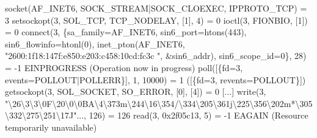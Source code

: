 \documentclass[
]{report}
\newenvironment{Shaded}{\begin{snugshade}}{\end{snugshade}}
\newcommand{\AttributeTok}[1]{\textcolor[rgb]{0.40,0.45,0.13}{#1}}
\newcommand{\BuiltInTok}[1]{\textcolor[rgb]{0.00,0.23,0.31}{#1}}
\newcommand{\ErrorTok}[1]{\textcolor[rgb]{0.68,0.00,0.00}{#1}}
\newcommand{\ExtensionTok}[1]{\textcolor[rgb]{0.00,0.23,0.31}{#1}}
\newcommand{\FunctionTok}[1]{\textcolor[rgb]{0.28,0.35,0.67}{#1}}
\newcommand{\KeywordTok}[1]{\textcolor[rgb]{0.00,0.23,0.31}{#1}}
\newcommand{\NormalTok}[1]{\textcolor[rgb]{0.00,0.23,0.31}{#1}}
\newcommand{\PreprocessorTok}[1]{\textcolor[rgb]{0.68,0.00,0.00}{#1}}
\newcommand{\SpecialStringTok}[1]{\textcolor[rgb]{0.13,0.47,0.30}{#1}}
\newcommand{\StringTok}[1]{\textcolor[rgb]{0.13,0.47,0.30}{#1}}
\begin{document}
\begin{Shaded}
\begin{Highlighting}[]
\ExtensionTok{socket}\ErrorTok{(}\ExtensionTok{AF\_INET6,}\NormalTok{ SOCK\_STREAM}\KeywordTok{|}\ExtensionTok{SOCK\_CLOEXEC,}\NormalTok{ IPPROTO\_TCP}\KeywordTok{)} \ExtensionTok{=}\NormalTok{ 3}
\ExtensionTok{setsockopt}\ErrorTok{(}\ExtensionTok{3,}\NormalTok{ SOL\_TCP, TCP\_NODELAY, }\PreprocessorTok{[}\SpecialStringTok{1}\PreprocessorTok{]}\NormalTok{, 4}\KeywordTok{)} \ExtensionTok{=}\NormalTok{ 0}
\ExtensionTok{ioctl}\ErrorTok{(}\ExtensionTok{3,}\NormalTok{ FIONBIO, }\PreprocessorTok{[}\SpecialStringTok{1}\PreprocessorTok{]}\KeywordTok{)}                  \ExtensionTok{=}\NormalTok{ 0}
\ExtensionTok{connect}\ErrorTok{(}\ExtensionTok{3,}\NormalTok{ \{sa\_family=AF\_INET6, sin6\_port=htons}\ErrorTok{(}\ExtensionTok{443}\KeywordTok{)}\ExtensionTok{,}\NormalTok{ sin6\_flowinfo=htonl}\ErrorTok{(}\ExtensionTok{0}\KeywordTok{)}\ExtensionTok{,}\NormalTok{ inet\_pton}\ErrorTok{(}\ExtensionTok{AF\_INET6,} \StringTok{"2600:1f18:147f:e850:e203:c458:10cd:fc3c}
\StringTok{"}\NormalTok{, }\KeywordTok{\&}\ExtensionTok{sin6\_addr}\KeywordTok{)}\ExtensionTok{,}\NormalTok{ sin6\_scope\_id=0\}, 28}\KeywordTok{)} \ExtensionTok{=} \AttributeTok{{-}1}\NormalTok{ EINPROGRESS }\ErrorTok{(}\ExtensionTok{Operation}\NormalTok{ now in progress}\KeywordTok{)}
\ExtensionTok{poll}\ErrorTok{(}\ExtensionTok{[\{fd=3,}\NormalTok{ events=POLLOUT}\KeywordTok{|}\ExtensionTok{POLLERR\}],}\NormalTok{ 1, 10000}\KeywordTok{)} \ExtensionTok{=}\NormalTok{ 1 }\ErrorTok{(}\ExtensionTok{[\{fd=3,}\NormalTok{ revents=POLLOUT\}]}\KeywordTok{)}
\ExtensionTok{getsockopt}\ErrorTok{(}\ExtensionTok{3,}\NormalTok{ SOL\_SOCKET, SO\_ERROR, }\PreprocessorTok{[}\SpecialStringTok{0}\PreprocessorTok{]}\NormalTok{, }\PreprocessorTok{[}\SpecialStringTok{4}\PreprocessorTok{]}\KeywordTok{)} \ExtensionTok{=}\NormalTok{ 0}
\ExtensionTok{[...]}
\FunctionTok{write}\ErrorTok{(}\ExtensionTok{3,} \StringTok{"\textbackslash{}26\textbackslash{}3\textbackslash{}3\textbackslash{}0F\textbackslash{}20\textbackslash{}0\textbackslash{}0BA\textbackslash{}4\textbackslash{}373m\textbackslash{}244\textbackslash{}16\textbackslash{}354/\textbackslash{}334\textbackslash{}205\textbackslash{}361j\textbackslash{}225\textbackslash{}356\textbackslash{}202m*\textbackslash{}305\textbackslash{}332\textbackslash{}275\textbackslash{}251\textbackslash{}17J"}\NormalTok{..., 126}\KeywordTok{)} \ExtensionTok{=}\NormalTok{ 126}
\BuiltInTok{read}\ErrorTok{(}\ExtensionTok{3,}\NormalTok{ 0x2f05c13, 5}\KeywordTok{)}                   \ExtensionTok{=} \AttributeTok{{-}1}\NormalTok{ EAGAIN }\ErrorTok{(}\ExtensionTok{Resource}\NormalTok{ temporarily unavailable}\KeywordTok{)}

\end{Highlighting}
\end{Shaded}
\end{document}
